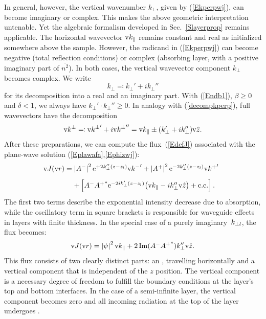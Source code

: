 In general, however, the vertical wavenumber $k_{\perp}$,
given by (\ref{Ekperpwj}),
can become imaginary or complex.
This makes the above geometric interpretation untenable.
Yet the algebraic formalism developed in Sec.~\ref{Slayerprop}
remains applicable.
The horizontal wavevector $\text{v}{k}_\parallel$ remains constant and real
as initialized somewhere above the sample.
However, the radicand in (\ref{Ekperpwj}) can become
negative (total reflection conditions) or complex
(absorbing layer,
with a positive imaginary part of $\overline{n^2}$).
In both cases, the vertical wavevector component $k_{\perp}$
becomes complex.
%
We write
\begin{equation}\label{decompkperp}
  k_\perp \eqqcolon k_\perp' + i k_\perp''
\end{equation}
for its decomposition into a real and an imaginary part.
With (\ref{Endb1}), $\beta\ge0$ and $\delta<1$,
we always have $k_\perp'\cdot k_\perp''\ge0$.
In analogy with (\ref{decompkperp}),
full wavevectors have the decomposition
\begin{equation}
  \text{v}{k}^\pm
  \eqqcolon {\text{v}{k}^\pm}' + i{\text{v}{k}^\pm}''
  = \text{v}{k}_\parallel \pm (k_\perp' + i k_\perp'')\text{v}{\hat z}.
\end{equation}
After these preparations,
we can compute the flux~(\ref{EdefJ})
associated with the plane-wave solution (\ref{Eplawafa},\ref{Ephizwj}):
\begin{equation}
  \begin{array}{@{}l@{\;}l}
  \v{J}(\r)
  =&   \left|A^-\right|^2 \e^{+2k_\perp'' (z-z_l)} {\k^-}'
    + \left|A^+\right|^2 \e^{-2k_\perp''(z-z_l)} {\k^+}'
\\[2ex]
  &+ \left[
      A^-{A^+}^* \e^{-2ik_\perp'(z-z_l)} {\left(\k_\plll-ik_\perp''\v{\hat z}\right)}
    + \text{c.c.}
    \right].
  \end{array}
\end{equation}
The first two terms describe the exponential intensity decrease
due to absorption, while
the oscillatory term in square brackets
is responsible for waveguide effects in layers with finite thickness.
In the special case of a purely imaginary~$k_{\perp l}$,
the flux becomes:
\begin{equation}
  \text{v}{J}(\text{v}{r}) = \left| \psi \right|^2 \text{v}{k}_\parallel + 2 \operatorname{Im} (A^-{A^+}^*) k_\perp''\text{v}{\hat z}.
\end{equation}
This flux consists of two clearly distinct parts: an ,
%
travelling horizontally
 and a vertical component that is independent of the $z$ position. The vertical component is a necessary
 degree of freedom to fulfill the boundary conditions at the layer's top and bottom interfaces.
In the case of a semi-infinite layer, the vertical component becomes zero and
 all incoming radiation at the top of the layer undergoes .
%
